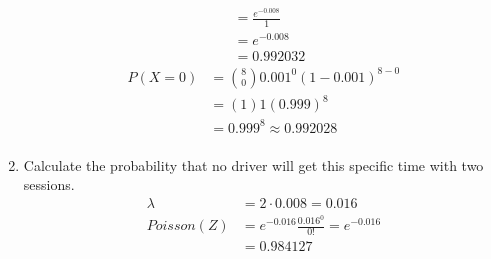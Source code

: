 \documentclass{article}
\begin{document}
\begin{enumerate}[label=\alph*)]
\begin{align*}
                       & = \frac{e^{-0.008}}{1}                \\
                       & = e^{-0.008}                          \\
                       & = 0.992032
          \end{align*}
          \begin{align*}
              P(X = 0)
               & = \binom{8}{0}0.001^0(1-0.001)^{8-0} \\
               & = (1)1(0.999)^8                      \\
               & = 0.999^8 \approx 0.992028           \\
          \end{align*}
    \item Calculate the probability that no driver will get this specific time with two sessions.
          \begin{align*}
              \lambda    & = 2\cdot0.008 = 0.016                        \\
              Poisson(Z) & = e^{-0.016} \frac{0.016^0}{0!} = e^{-0.016} \\
                         & = 0.984127
          \end{align*}
\end{enumerate}
\end{document}
